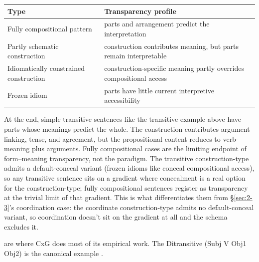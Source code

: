 {\def\LTcaptype{none} %
\begin{longtable}[]{@{}
  >{\raggedright\arraybackslash}p{}
  >{\raggedright\arraybackslash}p{}@{}}
\toprule\noalign{}
\begin{minipage}[t]{\linewidth}\raggedright
Type
\end{minipage} & \begin{minipage}[t]{\linewidth}\raggedright
Transparency profile
\end{minipage} \\
\midrule\noalign{}
\endhead
\bottomrule\noalign{}
\endlastfoot
Fully compositional pattern & parts and arrangement predict the interpretation \\
Partly schematic construction & construction contributes meaning, but parts remain interpretable \\
Idiomatically constrained construction & construction-specific meaning partly overrides compositional access \\
Frozen idiom & parts have little current interpretive accessibility \\
\end{longtable}
}

At the  end, simple transitive sentences like the transitive  example above have parts whose meanings predict the whole. The construction contributes argument linking, tense, and agreement, but the propositional content reduces to verb-meaning plus arguments. Fully compositional cases are the limiting endpoint of form--meaning transparency, not the paradigm. The transitive construction-type admits a default-conceal variant (frozen idioms like  conceal compositional access), so any transitive sentence sits on a gradient where concealment is a real option for the construction-type; fully compositional sentences register as transparency at the trivial limit of that gradient. This is what differentiates them from §\ref{sec:2-3}'s coordination case: the coordinate construction-type admits no default-conceal variant, so coordination doesn't sit on the gradient at all and the schema excludes it.

 are where CxG does most of its empirical work. The Ditransitive (Subj V Obj1 Obj2) is the canonical example \autocite[10]{goldberg-2006-constructions-at-work}.

\begin{samepage}
\ea\label{ex:ditransitive-animacy}
\ea {}
\ex {}
\ex {}
\z
\z
\end{samepage}

